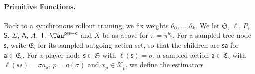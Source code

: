 \documentclass[12pt, a4paper]{article}
\begin{document}
\paragraph{Primitive Functions.}
Back to a synchronous rollout training, we fix weights $\theta_0,\ldots, \theta_k$.
We let $\mathfrak{S}$, $\ell$, $P$, $\mathsf{S}$, $\Sigma$, $\mathsf{A}$, $A$, $\mathsf{T}$, $\Tau^{\mathsf{pre-c}}$ and $X$ be as above for $\pi = \pi^{\theta_k}$.
For a sampled-tree node $\mathsf{s}$, write $\mathfrak{E}_{\mathsf{s}}$ for its sampled outgoing-action set, so that the children are $\mathsf{s}\mathsf{a}$ for $\mathsf{a}\in\mathfrak{E}_{\mathsf{s}}$.
For a player node $\mathsf{s}\in \mathfrak{S}$ with $\ell(\mathsf{s})=\sigma$, a sampled action $\mathsf{a}\in\mathfrak{E}_{\mathsf{s}}$ with $\ell(\mathsf{s}\mathsf{a})=\sigma a_{\mathsf{a}}$, $p=o(\sigma)$ and $x_p\in\mathcal X_p$, we define the estimators
\end{document}
